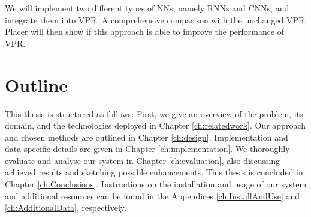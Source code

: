 We will implement two different types of \glspl{NN}, namely \glspl{RNN} and \glspl{CNN}, and integrate them into \gls{VPR}. A comprehensive comparison with the unchanged \gls{VPR} Placer will then show if this approach is able to improve the performance of \gls{VPR}.

\section{Outline}

This thesis is structured as follows: First, we give an overview of the problem, its domain, and the technologies deployed in Chapter \ref{ch:relatedwork}. Our approach and chosen methods are outlined in Chapter \ref{ch:design}. Implementation and data specific details are given in Chapter \ref{ch:implementation}. We thoroughly evaluate and analyse our system in Chapter \ref{ch:evaluation}, also discussing achieved results and sketching possible enhancements. This thesis is concluded in Chapter \ref{ch:Conclusions}. Instructions on the installation and usage of our system and additional resources can be found in the Appendices \ref{ch:InstallAndUse} and \ref{ch:AdditionalData}, respectively.